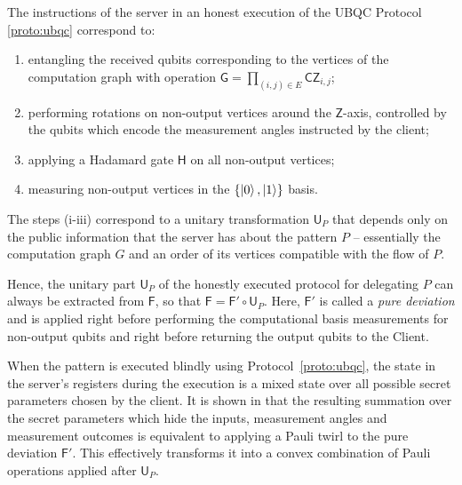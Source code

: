 \documentclass[12pt]{iopart}
\newcommand{\cptp}[1]{\mathsf{#1}} \newcommand{\pd}[1]{\mathcal{#1}}  \newcommand{\sch}[1]{\bm{#1}}
\newcommand{\Z}{\cptp{Z}}
\newcommand{\Ha}{\cptp{H}}
\renewcommand{\1}{\mathds{1}}
\newcommand{\CZ}{\mathsf{CZ}}
\begin{document}
The instructions of the server in an honest execution of the UBQC Protocol \ref{proto:ubqc} correspond to:
\begin{enumerate}
\item entangling the received qubits corresponding to the vertices of the computation graph with operation $\cptp G = \prod_{(i,j) \in E} \CZ_{i, j}$;
\item performing rotations on non-output vertices around the $\Z$-axis, controlled by the qubits which encode the measurement angles instructed by the client;
\item applying a Hadamard gate $\Ha$ on all non-output vertices;
\item measuring non-output vertices in the $\{\ket 0, \ket 1\}$ basis.
\end{enumerate}
The steps (i-iii) correspond to a unitary transformation $\cptp U_P$ that depends only on the public information that the server has about the pattern $P$ -- essentially the computation graph $G$ and an order of its vertices compatible with the flow of $P$.

Hence, the unitary part $\cptp U_P$ of the honestly executed protocol for delegating $P$ can always be extracted from $\cptp F$, so that $\cptp F = \cptp F' \circ \cptp U_P$. 
Here, $\cptp F'$ is called a \emph{pure deviation} and is applied right before performing the computational basis measurements for non-output qubits and right before returning the output qubits to the Client.



When the pattern is executed blindly using Protocol~\ref{proto:ubqc}, the state in the server's registers during the execution is a mixed state over all possible secret parameters chosen by the client. It is shown in \cite{K16:efficient} that the resulting summation over the secret parameters which hide the inputs, measurement angles and measurement outcomes is equivalent to applying a Pauli twirl to the pure deviation $\cptp F'$.
This effectively transforms it into a convex combination of Pauli operations applied after $\cptp U_P$.
\end{document}
